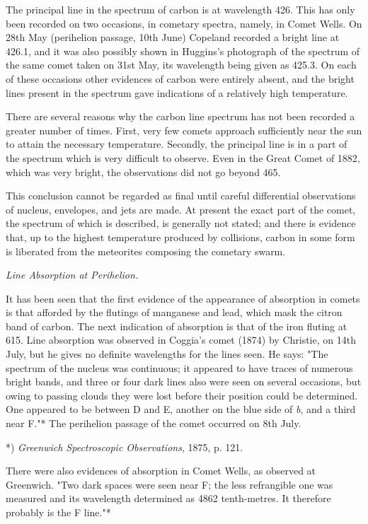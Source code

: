 \documentclass[a4paper, 12pt, oneside, polutonikogreek, english]{article}
\begin{document}
The principal line in the spectrum of carbon is at wavelength 426. This has only been recorded on two occasions, in cometary spectra, namely, in Comet Wells. On 28th May (perihelion passage, 10th June) Copeland recorded a bright line at 426.1, and it was also possibly shown in Huggins's photograph of the spectrum of the same comet taken on 31st May, its wavelength being given as 425.3. On each of these occasions other evidences of carbon were entirely absent, and the bright lines present in the spectrum gave indications of a relatively high temperature.

There are several reasons why the carbon line spectrum has not been recorded a greater number of times. First, very few comets approach sufficiently near the sun to attain the necessary temperature. Secondly, the principal line is in a part of the spectrum which is very difficult to observe. Even in the Great Comet of 1882, which was very bright, the observations did not go beyond 465.

This conclusion cannot be regarded as final until careful differential observations of nucleus, envelopes, and jets are made. At present the exact part of the comet, the spectrum of which is described, is generally not stated; and there is evidence that, up to the highest temperature produced by collisions, carbon in some form is liberated from the meteorites composing the cometary swarm.

\emph{Line Absorption at Perihelion.}

It has been seen that the first evidence of the appearance of absorption in comets is that afforded by the flutings of manganese and lead, which mask the citron band of carbon. The next indication of absorption is that of the iron fluting at 615. Line absorption was observed in Coggia's comet (1874) by Christie, on 14th July, but he gives no definite wavelengths for the lines seen. He says: "The spectrum of the nucleus was continuous; it appeared to have traces of numerous bright bands, and three or four dark lines also were seen on several occasions, but owing to passing clouds they were lost before their position could be determined. One appeared to be between D and E, another on the blue side of \emph{b}, and a third near F."* The perihelion passage of the comet occurred on 8th July.

*) \emph{Greenwich Spectroscopic Observations}, 1875, p. 121.

There were also evidences of absorption in Comet Wells, as observed at Greenwich. "Two dark spaces were seen near F; the less refrangible one was measured and its wavelength determined as 4862 tenth-metres. It therefore probably is the F line."*
\end{document}
